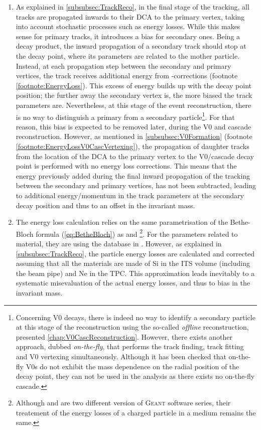 \begin{enumerate}
\item As explained in \Sec\ref{subsubsec:TrackReco}, in the final stage of the tracking, all tracks are propagated inwards to their DCA to the primary vertex, taking into account stochastic processes such as energy losses. While this makes sense for primary tracks, it introduces a bias for secondary ones. Being a decay product, the inward propagation of a secondary track should stop at the decay point, where its parameters are related to the mother particle. Instead, at each propagation step between the secondary and primary vertices, the track receives additional energy from \dEdx-corrections (footnote \ref{footnote:EnergyLoss}). This excess of energy builds up with the decay point position; the further away the secondary vertex is, the more biased the track parameters are. Nevertheless, at this stage of the event reconstruction, there is no way to distinguish a primary from a secondary particle\footnote{Concerning V0 decays, there is indeed no way to identify a secondary particle at this stage of the reconstruction using the so-called \textit{offline} reconstruction, presented \chap\ref{chap:V0CascReconstruction}. However, there exists another approach, dubbed \textit{on-the-fly}, that performs the track finding, track fitting and V0 vertexing simultaneously. Although it has been checked that on-the-fly V0s do not exhibit the mass dependence on the radial position of the decay point, they can not be used in the analysis as there exists no on-the-fly cascade.}. For that reason, this bias is expected to be removed later, during the V0 and cascade reconstruction. However, as mentioned in \Sec\ref{subsubsec:V0Formation} (footnote \ref{footnote:EnergyLossV0CascVertexing}), the propagation of daughter tracks from the location of the DCA to the primary vertex to the V0/cascade decay point is performed with no energy loss corrections. This means that the energy previously added during the final inward propagation of the tracking between the secondary and primary vertices, has not been subtracted, leading to additional energy/momentum in the track parameters at the
secondary decay position and thus to an offset in the invariant mass.

\item The energy loss calculation relies on the same parametrisation of the Bethe-Bloch formula (\eq\ref{eq:BetheBloch}) as \GeantThree and \GeantFour\footnote{Although \GeantThree and \GeantFour are two different version of \textsc{Geant} software series, their treatement of the energy losses of a charged particle in a medium remains the same.}. For the parameters related to material, they are using the database in \cite{geant4Geant4MaterialDatabase2022}. However, as explained in \Sec\ref{subsubsec:TrackReco}, the particle energy losses are calculated and corrected assuming that all the materials are made of Si in the ITS volume (including the beam pipe) and Ne in the TPC. This approximation leads inevitably to a systematic misevaluation of the actual energy losses, and thus to bias in the invariant mass.


\end{enumerate}
